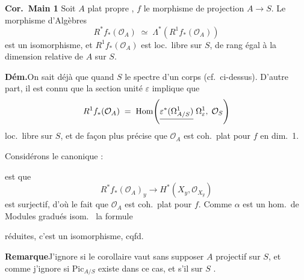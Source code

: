 \documentclass[11pt,a4paper]{article}
\begin{document}

\textbf{Cor.\ Main 1}\quad {} Soit
 $A$ plat propre \ill{}, $f$ le
 morphisme de projection
$A \to S$.  Le morphisme d'Algèbres
\[
  R^{*}f_{*}(\mathcal{O}_{A}) \;\simeq\;
  \Lambda^{*}\!\left(R^{1}f_{*}(\mathcal{O}_{A})\right)
\]
est un isomorphisme, et $R^{1}f_{*}(\mathcal{O}_{A})$ est loc.\ libre sur $S$,
de rang égal à la dimension relative de $A$ sur $S$.

\textbf{Dém.}\quad On sait déjà que \ill{} quand $S$ \ill{} le spectre d'un
corps (cf.\ ci-dessus). D'autre part, il est connu que \ill{} la section unité
$\varepsilon$ implique que
\[
  R^{1}f_{*}(\mathcal{O}_{A}) \;=\;
  \mathrm{Hom}\!\left(\struck{\varepsilon^{*}(\Omega^{1}_{A/S})}\;
  \Omega^{1}_{\varepsilon},\; \mathcal{O}_{S}\right)
\]
\ill{} loc.\ libre sur $S$, et de façon plus précise que $\mathcal{O}_{A}$ est
coh.\ plat pour $f$ en dim.\ 1.


Considérons le \struck{\ill{}}  canonique :



\ill{} est \ill{} que
\[
  R^{*}f_{*}(\mathcal{O}_{A})_{y} \longrightarrow H^{*}(X_{y}, \mathcal{O}_{X_{y}})
\]
est surjectif, d'où le fait que $\mathcal{O}_{A}$ est coh.\ plat pour $f$.
Comme $\alpha$ est un hom.\ de Modules \ill{} gradués \ill{} isom.\ \ill{} la
formule \ill{}


réduites, c'est un isomorphisme, cqfd.

\textbf{Remarque}\quad J'ignore si le corollaire vaut sans supposer $A$
projectif sur $S$, et comme j'ignore si $\mathrm{Pic}_{A/S}$ existe dans ce cas,
et s'il  \ill{} sur $S$ \ill{}.
\end{document}
